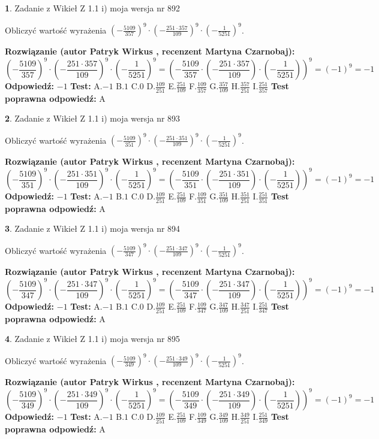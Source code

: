\documentclass[12pt, a4paper]{article}
\theoremstyle{definition} %
\newtheorem{zad}{}
\newcommand{\zadStart}[1]{\begin{zad}#1\newline}
\newcommand{\zadStop}{\end{zad}}
\newcommand{\rozwStart}[2]{\noindent \textbf{Rozwiązanie (autor #1 , recenzent #2): }\newline}
\newcommand{\rozwStop}{\newline}
\newcommand{\odpStart}{\noindent \textbf{Odpowiedź:}\newline}
\newcommand{\odpStop}{\newline}
\newcommand{\testStart}{\noindent \textbf{Test:}\newline}
\newcommand{\testStop}{\newline}
\newcommand{\kluczStart}{\noindent \textbf{Test poprawna odpowiedź:}\newline}
\newcommand{\kluczStop}{\newline}
\begin{document}
\zadStart{Zadanie z Wikieł Z 1.1 i) moja wersja nr 892}

Obliczyć wartość wyrażenia $(-\frac{5109}{357})^{9} \cdot (-\frac{251 \cdot 357}{109})^{9} \cdot (-\frac{1}{5251})^{9}$.
\zadStop
\rozwStart{Patryk Wirkus}{Martyna Czarnobaj}
$$(-\frac{5109}{357})^{9} \cdot (-\frac{251 \cdot 357}{109})^{9} \cdot (-\frac{1}{5251})^{9} = (-\frac{5109}{357} \cdot (-\frac{251 \cdot 357}{109}) \cdot (-\frac{1}{5251}))^{9} = (-1)^{9} = -1$$
\rozwStop
\odpStart
$-1$
\odpStop
\testStart
A.$-1$ B.$1$ C.$0$ D.$\frac{109}{251}$ E.$\frac{251}{109}$
F.$\frac{109}{357}$ G.$\frac{357}{109}$
H.$\frac{357}{251}$
I.$\frac{251}{357}$
\testStop
\kluczStart
A
\kluczStop



\zadStart{Zadanie z Wikieł Z 1.1 i) moja wersja nr 893}

Obliczyć wartość wyrażenia $(-\frac{5109}{351})^{9} \cdot (-\frac{251 \cdot 351}{109})^{9} \cdot (-\frac{1}{5251})^{9}$.
\zadStop
\rozwStart{Patryk Wirkus}{Martyna Czarnobaj}
$$(-\frac{5109}{351})^{9} \cdot (-\frac{251 \cdot 351}{109})^{9} \cdot (-\frac{1}{5251})^{9} = (-\frac{5109}{351} \cdot (-\frac{251 \cdot 351}{109}) \cdot (-\frac{1}{5251}))^{9} = (-1)^{9} = -1$$
\rozwStop
\odpStart
$-1$
\odpStop
\testStart
A.$-1$ B.$1$ C.$0$ D.$\frac{109}{251}$ E.$\frac{251}{109}$
F.$\frac{109}{351}$ G.$\frac{351}{109}$
H.$\frac{351}{251}$
I.$\frac{251}{351}$
\testStop
\kluczStart
A
\kluczStop



\zadStart{Zadanie z Wikieł Z 1.1 i) moja wersja nr 894}

Obliczyć wartość wyrażenia $(-\frac{5109}{347})^{9} \cdot (-\frac{251 \cdot 347}{109})^{9} \cdot (-\frac{1}{5251})^{9}$.
\zadStop
\rozwStart{Patryk Wirkus}{Martyna Czarnobaj}
$$(-\frac{5109}{347})^{9} \cdot (-\frac{251 \cdot 347}{109})^{9} \cdot (-\frac{1}{5251})^{9} = (-\frac{5109}{347} \cdot (-\frac{251 \cdot 347}{109}) \cdot (-\frac{1}{5251}))^{9} = (-1)^{9} = -1$$
\rozwStop
\odpStart
$-1$
\odpStop
\testStart
A.$-1$ B.$1$ C.$0$ D.$\frac{109}{251}$ E.$\frac{251}{109}$
F.$\frac{109}{347}$ G.$\frac{347}{109}$
H.$\frac{347}{251}$
I.$\frac{251}{347}$
\testStop
\kluczStart
A
\kluczStop



\zadStart{Zadanie z Wikieł Z 1.1 i) moja wersja nr 895}

Obliczyć wartość wyrażenia $(-\frac{5109}{349})^{9} \cdot (-\frac{251 \cdot 349}{109})^{9} \cdot (-\frac{1}{5251})^{9}$.
\zadStop
\rozwStart{Patryk Wirkus}{Martyna Czarnobaj}
$$(-\frac{5109}{349})^{9} \cdot (-\frac{251 \cdot 349}{109})^{9} \cdot (-\frac{1}{5251})^{9} = (-\frac{5109}{349} \cdot (-\frac{251 \cdot 349}{109}) \cdot (-\frac{1}{5251}))^{9} = (-1)^{9} = -1$$
\rozwStop
\odpStart
$-1$
\odpStop
\testStart
A.$-1$ B.$1$ C.$0$ D.$\frac{109}{251}$ E.$\frac{251}{109}$
F.$\frac{109}{349}$ G.$\frac{349}{109}$
H.$\frac{349}{251}$
I.$\frac{251}{349}$
\testStop
\kluczStart
A
\kluczStop
\end{document}
